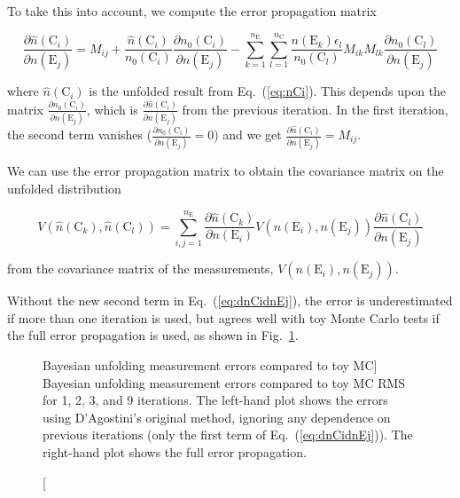 \documentclass[12pt,a4paper]{article}
\newcommand{\E}{\mathrm{E}}
\newcommand{\C}{\mathrm{C}}
\newcommand{\dd}[2]{\frac{\partial{#1}}{\partial{#2}}}
\begin{document}
To take this into account, we compute the error propagation matrix

\begin{equation}
\dd{\hat{n}(\C_i)}{n(\E_j)} = M_{ij} + 
\frac{\hat{n}(\C_i)}{n_0(\C_i)} \dd{n_0(\C_i)}{n(\E_j)} -
\sum_{k=1}^{n_{\E}} \sum_{l=1}^{n_{\C}} \frac{n(\E_k) \epsilon_l}{n_0(\C_l)} M_{ik} M_{lk} \dd{n_0(\C_l)}{n(\E_j)}
\label{eq:dnCidnEj}
\end{equation}

where $\hat{n}(\C_i)$ is the unfolded result from Eq.~(\ref{eq:nCi}).
This depends upon the matrix $\dd{n_0(\C_i)}{n(\E_j)}$, which is $\dd{\hat{n}(\C_i)}{n(\E_j)}$ from the previous iteration.
In the first iteration, the second term vanishes ($\dd{n_0(\C_i)}{n(\E_j)}=0$) and we get $\dd{\hat{n}(\C_i)}{n(\E_j)} = M_{ij}$.

We can use the error propagation matrix to obtain the covariance matrix on the unfolded distribution

\begin{equation}
V(\hat{n}(\C_k),\hat{n}(\C_l)) = \sum_{i,j=1}^{n_{\E}} \dd{\hat{n}(\C_k)}{n(\E_i)} V(n(\E_i),n(\E_j)) \dd{\hat{n}(\C_l)}{n(\E_j)}
\label{eq:Vij}
\end{equation}

\noindent from the covariance matrix of the measurements, $V(n(\E_i),n(\E_j))$.

Without the new second term in Eq.~(\ref{eq:dnCidnEj}),
the error is underestimated if more than one iteration
is used, but agrees well with toy Monte Carlo tests if the full error propagation is used,
as shown in Fig.~\ref{fig:bayes_errors}.%
\begin{figure}[ht]
%
\caption
[Bayesian unfolding measurement errors compared to toy MC]%
{Bayesian unfolding measurement errors compared to toy MC RMS for 1, 2, 3, and 9 iterations.
The left-hand plot shows the errors using D'Agostini's original method,
ignoring any dependence on previous iterations (only the first term of Eq.~(\ref{eq:dnCidnEj})).
The right-hand plot shows the full error propagation.}%
\label{fig:bayes_errors}%
\end{figure}
\end{document}
